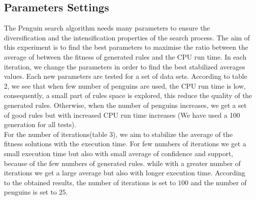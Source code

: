\documentclass[preprint,12pt]{elsarticle}
\begin{document}
\subsection{Parameters Settings}
The Penguin search algorithm needs many parameters to ensure the diversification and the intensification properties of the search
process. The aim of this experiment is to find the best parameters to maximise the ratio 
between the average of between the fitness of generated rules and the CPU run time. 
In each iteration, we change the parameters in order to find the best stabilized averages values. Each new parameters are tested for a set of  data sets. According to table 2, we see that when few number of penguins are used, the CPU run time is low, consequently, 
a small part of rules space is explored, this reduce the quality of the generated rules. Otherwise, when the number of penguins 
increases, we get a set of good rules but with increased CPU run time increases (We have used a 100 generation for all tests).\\
For the number of iterations(table 3), we aim to stabilize the average of the fitness solutions with the execution time. For few numbers of iterations 
we get a small execution time but also with small average of confidence and support, because of the few numbers of generated rules.
while with a greater number of iterations we get a large average but also with longer execution time. According to the obtained results, 
the number of iterations is set to $100$ and the number of penguins is set to $25$.
\end{document}
